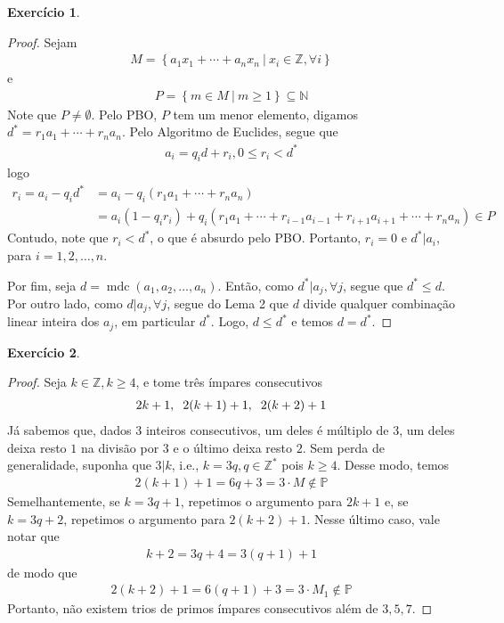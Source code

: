\documentclass[a4paper,12pt]{article}
\DeclareMathOperator{\mdc}{mdc}
\theoremstyle{definition}
\newtheorem{exercise}{Exercício}%
\begin{document}
	\begin{exercise}
		\begin{proof}
			Sejam 
			\begin{align*}
			M = \left\{ a_1x_1 + \cdots + a_nx_n \ | \ x_i\in\mathbb{Z}, \forall i \right\}
			\end{align*}
			e
			\begin{align*}
			P = \left\{ m\in M \ | \ m\geq 1 \right\}\subseteq\mathbb{N}
			\end{align*}
			Note que $P\neq \emptyset$.	Pelo PBO, $P$ tem um menor elemento, digamos $d^{\ast} = r_1a_1 + \cdots + r_na_n$. Pelo Algoritmo de Euclides, segue que
			\begin{align*}
			a_i = q_id + r_i, 0\leq r_i < d^{\ast}
			\end{align*}
			logo \begin{align*}
			r_i = a_i - q_id^{\ast} &= a_i - q_i(r_1a_1 + \cdots + r_na_n) \\
			&= a_i(1 - q_ir_i) + q_i(r_1a_1 + \cdots + r_{i-1}a_{i-1} + r_{i+1}a_{i+1} + \cdots + r_na_n)\in P
			\end{align*}
			Contudo, note que $r_i<d^{\ast}$, o que é absurdo pelo PBO. Portanto, $r_i=0$ e $d^{\ast}|a_i$, para $i = 1, 2, \dots, n$.
			\par Por fim, seja $d = \mdc(a_1, a_2, \dots, a_n)$. Então, como $d^{\ast}|a_j, \forall j$, segue que $d^{\ast}\leq d$. Por outro lado, como $d|a_j, \forall j$, segue do Lema 2 que $d$ divide qualquer combinação linear inteira dos $a_j$, em particular $d^{\ast}$. Logo, $d\leq d^{\ast}$ e temos $d = d^{\ast}$.
		\end{proof}
	\end{exercise}
	\begin{exercise}
		\begin{proof}
			Seja $k\in\mathbb{Z}, k\geq 4$, e tome três ímpares consecutivos
			\begin{align*}
			2k + 1, \hspace{0.2cm} 2(k+1) + 1, \hspace{0.2cm} 2(k+2) + 1
			\end{align*}
			Já sabemos que, dados $3$ inteiros consecutivos, um deles é múltiplo de $3$, um deles deixa resto $1$ na divisão por $3$ e o último deixa resto $2$. Sem perda de generalidade, suponha que $3|k$, i.e., $k = 3q, q\in\mathbb{Z}^{\ast}$ pois $k\geq 4$. Desse modo, temos
			\begin{align*}
			2(k+1) + 1 = 6q + 3 = 3\cdot M \notin\mathbb{P}
			\end{align*}
			Semelhantemente, se $k = 3q + 1$, repetimos o argumento para $2k+1$ e, se $k = 3q + 2$, repetimos o argumento para $2(k+2) + 1$. Nesse último caso, vale notar que
			\begin{align*}
			k + 2 = 3q + 4 = 3(q + 1) + 1
			\end{align*}
			de modo que
			\begin{align*}
			2(k+2) + 1 = 6(q + 1) + 3 = 3\cdot M_1 \notin\mathbb{P}
			\end{align*}
			Portanto, não existem trios de primos ímpares consecutivos além de $3,5,7$. 
		\end{proof}
	\end{exercise}
\end{document}
